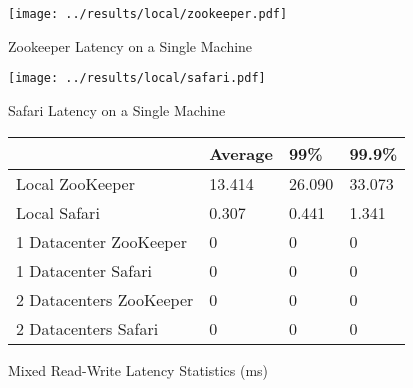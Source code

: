 

\begin{figure}[h]
  \caption{Zookeeper Latency on a Single Machine}
  \centering
  \texttt{[image: ../results/local/zookeeper.pdf]}
\end{figure}

\begin{figure}[h]
  \caption{Safari Latency on a Single Machine}
  \centering
  \texttt{[image: ../results/local/safari.pdf]}
\end{figure}


\begin{figure}[h]
  \caption{Mixed Read-Write Latency Statistics (ms)}
  \begin{center}
    \begin{tabular}{| l | l | l | l |}
    \hline
    & Average & 99\% & 99.9\% \\ \hline
    Local ZooKeeper & 13.414 & 26.090 & 33.073 \\ \hline
    Local Safari & 0.307 & 0.441 & 1.341 \\ \hline\hline
    1 Datacenter ZooKeeper & 0 & 0 & 0 \\ \hline
    1 Datacenter Safari & 0 & 0 & 0 \\ \hline\hline
    2 Datacenters ZooKeeper & 0 & 0 & 0 \\ \hline
    2 Datacenters Safari & 0 & 0 & 0 \\
    \hline
    \end{tabular}
  \end{center}
\end{figure}

